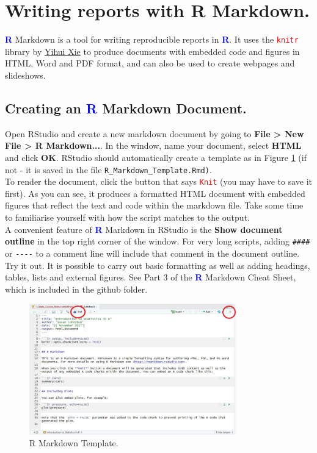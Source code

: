 \documentclass[a4paper,12pt]{article}
\newcommand\boldblue[1]{\textcolor{blue}{\textbf{#1}}}
\newcommand\code[1]{\textcolor{red}{\texttt{#1}}}
\begin{document}
\section {Writing reports with R Markdown.}


\boldblue{R} Markdown is a tool for writing reproducible reports in \boldblue{R}. It uses the \code{knitr} library by \href{https://yihui.name/knitr/}{Yihui Xie} to produce documents with embedded code and figures in HTML, Word and PDF format, and can also be used to create webpages and slideshows. 

\subsection{Creating an \boldblue{R} Markdown Document.}

Open RStudio and create a new markdown document by going to \textbf{File > New File > R Markdown...}. In the window, name your document, select \textbf{HTML} and click \textbf{OK}. RStudio should automatically create a template as in Figure \ref{fig:MarkdownTemplate} (if not - it is saved in the file \texttt{R\_Markdown\_Template.Rmd)}. \\

To render the document, click the button that says \code{Knit} (you may have to save it first). As you can see, it produces a formatted HTML document with embedded figures that reflect the text and code within the markdown file. Take some time to familiarise yourself with how the script matches to the output. \\

A convenient feature of \boldblue{R} Markdown in RStudio is the \textbf{Show document outline} in the top right corner of the window. For very long scripts, adding \verb!####! or \verb!----! to a comment line will include that comment in the document outline. Try it out. It is possible to carry out basic formatting as well as adding headings, tables, lists and external figures. See Part 3 of the \boldblue{R} Markdown Cheat Sheet, which is included in the github folder. \\

\begin{figure}[h]
\centering 
\includegraphics[width=0.8\textwidth]{figs/MarkdownTemplate.JPG}
\caption{R Markdown Template.}
\label{fig:MarkdownTemplate}
\end{figure} 
\end{document}
